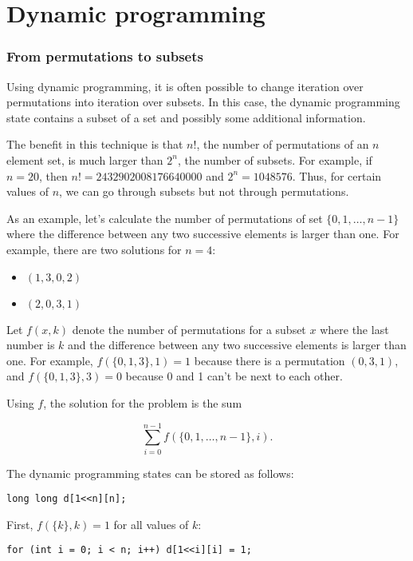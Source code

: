 \section{Dynamic programming}

\subsubsection{From permutations to subsets}

Using dynamic programming, it is often possible
to change iteration over permutations into
iteration over subsets.
In this case, the dynamic programming state
contains a subset of a set and possibly
some additional information.

The benefit in this technique is that
$n!$, the number of permutations of an $n$ element set,
is much larger than $2^n$, the number of subsets.
For example, if $n=20$, then
$n!=2432902008176640000$ and $2^n=1048576$.
Thus, for certain values of $n$,
we can go through subsets but not through permutations.

As an example, let's calculate the number of
permutations of set $\{0,1,\ldots,n-1\}$
where the difference between any two successive
elements is larger than one.
For example, there are two solutions for $n=4$:
\begin{itemize}
\item $(1,3,0,2)$
\item $(2,0,3,1)$
\end{itemize}

Let $f(x,k)$ denote the number of permutations
for a subset $x$
where the last number is $k$ and
the difference between any two successive
elements is larger than one.
For example, $f(\{0,1,3\},1)=1$
because there is a permutation $(0,3,1)$,
and $f(\{0,1,3\},3)=0$ because 0 and 1
can't be next to each other.

Using $f$, the solution for the problem is the sum

\[ \sum_{i=0}^{n-1} f(\{0,1,\ldots,n-1\},i). \]

\noindent
The dynamic programming states can be stored as follows:

\begin{lstlisting}
long long d[1<<n][n];
\end{lstlisting}

\noindent
First, $f(\{k\},k)=1$ for all values of $k$:

\begin{lstlisting}
for (int i = 0; i < n; i++) d[1<<i][i] = 1;
\end{lstlisting}

